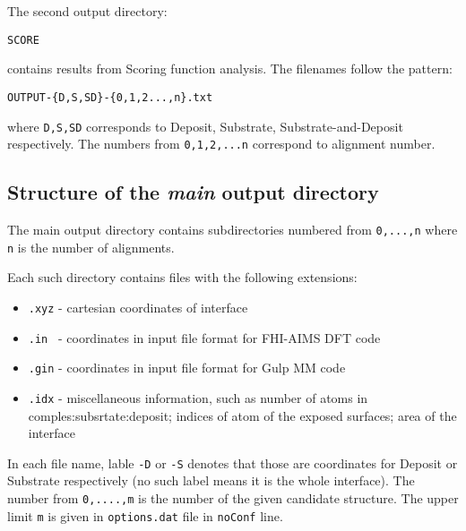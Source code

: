 \documentclass[a4paper,12pt,oneside]{article}
\begin{document}
The second output directory:
\begin{verbatim}
SCORE
\end{verbatim}
contains results from Scoring function analysis. The filenames follow the
pattern:
\begin{verbatim}
OUTPUT-{D,S,SD}-{0,1,2...,n}.txt
\end{verbatim}
where \texttt{D,S,SD} corresponds to Deposit, Substrate, Substrate-and-Deposit
respectively. The numbers from \texttt{0,1,2,...n} correspond to alignment
number. 

\subsection{Structure of the \textit{main} output directory}
The main output directory contains subdirectories numbered from \texttt{0,...,n}
where \texttt{n} is the number of alignments. 

Each such directory contains files with the following extensions:
\begin{itemize}
\item{\texttt{.xyz} - cartesian coordinates of interface}
\item{\texttt{.in}~  - coordinates in input file format for FHI-AIMS DFT code }
\item{\texttt{.gin}  - coordinates in input file format for Gulp MM code }
\item{\texttt{.idx} - miscellaneous information, such as number of atoms in
comples:subsrtate:deposit; indices of atom of the exposed surfaces; area of the
interface}
\end{itemize}
In each file name, lable \texttt{-D} or \texttt{-S} denotes that those are
coordinates for Deposit or Substrate respectively (no such label means it is the
whole interface). The number from \texttt{0,....,m} is the number of the given
candidate structure. The upper limit \texttt{m} is given in \texttt{options.dat}
file in \texttt{noConf} line. 
\end{document}
